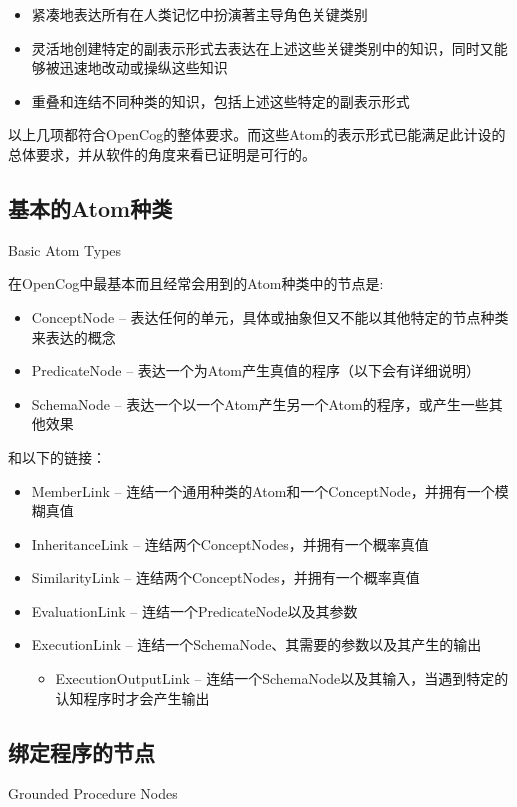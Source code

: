 \begin{itemize}
\item 紧凑地表达所有在人类记忆中扮演著主导角色关键类别
\item 灵活地创建特定的副表示形式去表达在上述这些关键类别中的知识，同时又能够被迅速地改动或操纵这些知识
\item 重叠和连结不同种类的知识，包括上述这些特定的副表示形式
\end{itemize}

\noindent 以上几项都符合OpenCog的整体要求。而这些Atom的表示形式已能满足此计设的总体要求，并从软件的角度来看已证明是可行的。

\subsection{基本的Atom种类}{Basic Atom Types}

在OpenCog中最基本而且经常会用到的Atom种类中的节点是:

\begin{itemize}
\item ConceptNode -- 表达任何的单元，具体或抽象但又不能以其他特定的节点种类来表达的概念
\item PredicateNode  -- 表达一个为Atom产生真值的程序（以下会有详细说明）
\item SchemaNode -- 表达一个以一个Atom产生另一个Atom的程序，或产生一些其他效果
\end{itemize}

和以下的链接：

\begin{itemize}
\item MemberLink -- 连结一个通用种类的Atom和一个ConceptNode，并拥有一个模糊真值
\item InheritanceLink -- 连结两个ConceptNodes，并拥有一个概率真值
\item SimilarityLink -- 连结两个ConceptNodes，并拥有一个概率真值
\item EvaluationLink -- 连结一个PredicateNode以及其参数
\item ExecutionLink -- 连结一个SchemaNode、其需要的参数以及其产生的输出
\begin{itemize}
\item ExecutionOutputLink -- 连结一个SchemaNode以及其输入，当遇到特定的认知程序时才会产生输出
\end{itemize}
\end{itemize}


\subsection{绑定程序的节点}{Grounded Procedure Nodes}

